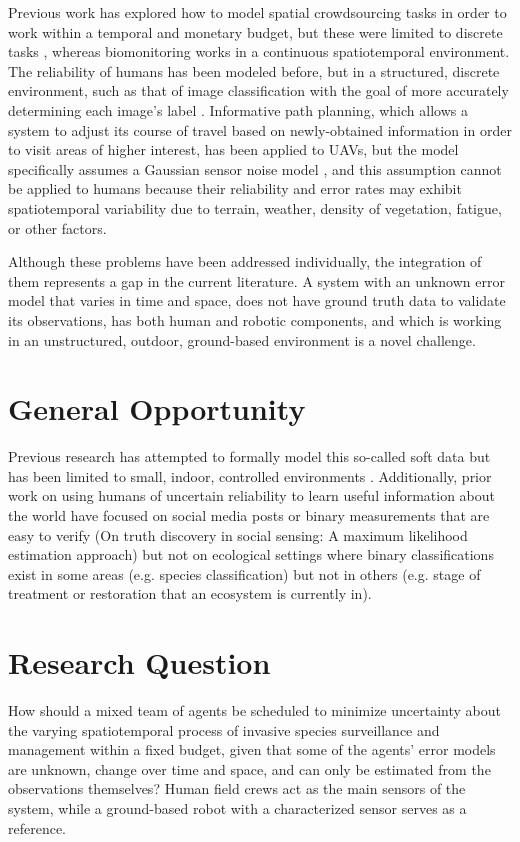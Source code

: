\documentclass{article}
\begin{document}
Previous work has explored how to model spatial crowdsourcing tasks in order to work within a temporal and monetary budget, but these were limited to discrete tasks \cite{10.1007/s00778-019-00568-7}, whereas biomonitoring works in a continuous spatiotemporal environment. The reliability of humans has been modeled before, but in a structured, discrete environment, such as that of image classification with the goal of more accurately determining each image’s label \cite{whose-vote-should-count-more}. Informative path planning, which allows a system to adjust its course of travel based on newly-obtained information in order to visit areas of higher interest, has been applied to UAVs, but the model specifically assumes a Gaussian sensor noise model \cite{informative-path-planning-framework}, and this assumption cannot be applied to humans \cite{6846739} because their reliability and error rates may exhibit spatiotemporal variability due to terrain, weather, density of vegetation, fatigue, or other factors.

Although these problems have been addressed individually, the integration of them represents a gap in the current literature. A system with an unknown error model that varies in time and space, does not have ground truth data to validate its observations, has both human and robotic components, and which is working in an unstructured, outdoor, ground-based environment is a novel challenge.


\section{General Opportunity}
Previous research has attempted to formally model this so-called soft data but has been limited to small, indoor, controlled environments \cite{6301744}. Additionally, prior work on using humans of uncertain reliability to learn useful information about the world have focused on social media posts \cite{6846739} or binary measurements that are easy to verify (On truth discovery in social sensing: A maximum likelihood estimation approach) but not on ecological settings where binary classifications exist in some areas (e.g. species classification) but not in others (e.g. stage of treatment or restoration that an ecosystem is currently in).


\section{Research Question}
How should a mixed team of agents be scheduled to minimize uncertainty about the varying spatiotemporal process of invasive species surveillance and management within a fixed budget, given that some of the agents’ error models are unknown, change over time and space, and can only be estimated from the observations themselves? Human field crews act as the main sensors of the system, while a ground-based robot with a characterized sensor serves as a reference.
\end{document}
